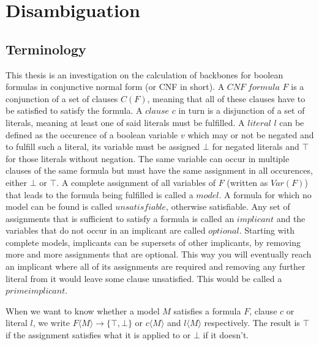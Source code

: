\section{Disambiguation}
\subsection{Terminology}
This thesis is an investigation on the calculation of backbones for boolean formulas in conjunctive normal form (or CNF in short). A $CNF\;formula$ $F$ is a conjunction of a set of clauses $C(F)$, meaning that all of these clauses have to be satisfied to satisfy the formula. A $clause$ $c$ in turn is a disjunction of a set of literals, meaning at least one of said literals must be fulfilled. A $literal$ $l$ can be defined as the occurence of a boolean variable $v$ which may or not be negated and to fulfill such a literal, its variable must be assigned $\bot$ for negated literals and $\top$ for those literals without negation. The same variable can occur in multiple clauses of the same formula but must have the same assignment in all occurences, either $\bot$ or $\top$. A complete assignment of all variables of $F$ (written as $Var(F)$) that leads to the formula being fulfilled is called a $model$. A formula for which no model can be found is called $unsatisfiable$, otherwise satisfiable. 
Any set of assignments that is sufficient to satisfy a formula is called an $implicant$ and the variables that do not occur in an implicant are called $optional$. Starting with complete models, implicants can be supersets of other implicants, by removing more and more assignments that are optional. This way you will eventually reach an implicant where all of its assignments are required and removing any further literal from it would leave some clause unsatisfied. This would be called a $prime implicant$.


When we want to know whether a model $M$ satisfies a formula $F$, clause $c$ or literal $l$, we write $F\langle M\rangle \rightarrow \{\top,\bot\}$ or $c\langle M\rangle$ and $l\langle M\rangle$ respectively. The result is $\top$ if the assignment satisfies what it is applied to or $\bot$ if it doesn't.

